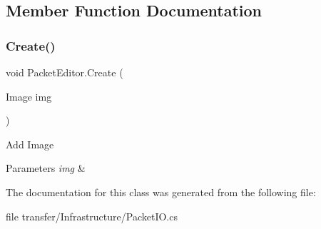\subsection{Member Function Documentation}
\mbox{\label{class_packet_editor_ab9ab39994a95003625b86b1a79851646}} 
\subsubsection{\texorpdfstring{Create()}{Create()}}
{\footnotesize\ttfamily void Packet\+Editor.\+Create (\begin{DoxyParamCaption}\item[{Image}]{img }\end{DoxyParamCaption})}



Add Image 


\begin{DoxyParams}{Parameters}
{\em img} & \\
\hline
\end{DoxyParams}


The documentation for this class was generated from the following file\+:\begin{DoxyCompactItemize}
\item 
file transfer/\+Infrastructure/Packet\+I\+O.\+cs\end{DoxyCompactItemize}
